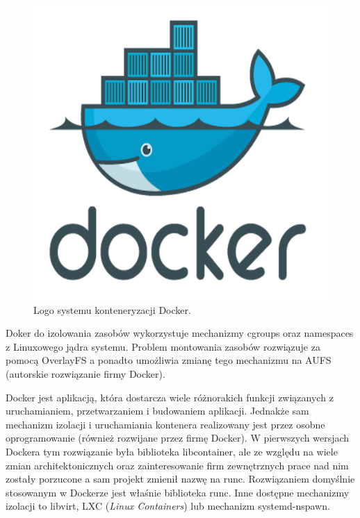 \documentclass[10pt,a4paper,titlepage,twoside]{report}
\begin{document}
\begin{figure}[ht!]
	\centering
	\includegraphics[scale=0.7]{pics/docker.png}
	\caption{Logo systemu konteneryzacji Docker.}
	\label{docker_logo}
\end{figure}

Doker do izolowania zasobów wykorzystuje mechanizmy cgroups oraz namespaces z Linuxowego jądra systemu. Problem montowania zasobów rozwiązuje za pomocą OverlayFS a ponadto umożliwia zmianę tego mechanizmu na AUFS (autorskie rozwiązanie firmy Docker).

Docker jest aplikacją, która dostarcza wiele różnorakich funkcji związanych z uruchamianiem, przetwarzaniem i budowaniem aplikacji. Jednakże sam mechanizm izolacji i uruchamiania kontenera realizowany jest przez osobne oprogramowanie (również rozwijane przez firmę Docker). W pierwszych wersjach Dockera tym rozwiązanie była biblioteka libcontainer, ale ze względu na wiele zmian architektonicznych oraz zainteresowanie firm zewnętrznych prace nad nim zostały porzucone a sam projekt zmienił nazwę na runc. Rozwiązaniem domyślnie stosowanym w Dockerze jest właśnie biblioteka runc. Inne dostępne mechanizmy izolacji to libvirt, LXC (\textit{Linux Containers}) lub mechanizm systemd-nspawn.
\end{document}
